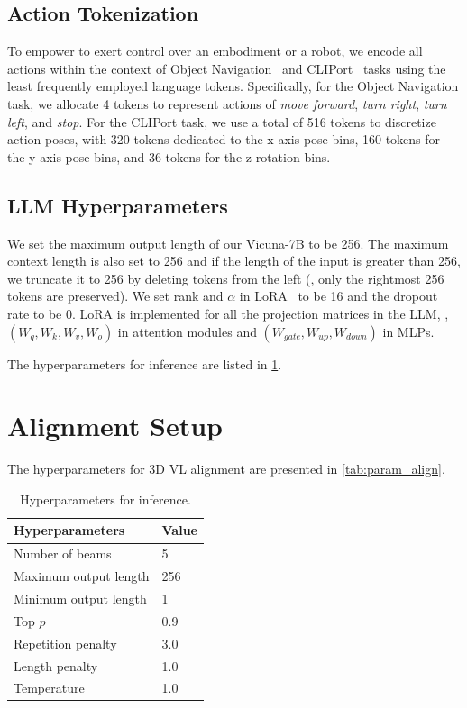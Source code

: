 \subsection{Action Tokenization}\label{sec:action_tokenization}

To empower \agent to exert control over an embodiment or a robot, we encode all actions within the context of Object Navigation~\citep{ramrakhya2022habitat} and CLIPort~\citep{cliport} tasks using the least frequently employed language tokens. Specifically, for the Object Navigation task, we allocate 4 tokens to represent actions of \textit{move forward}, \textit{turn right}, \textit{turn left}, and \textit{stop}. For the CLIPort task, we use a total of 516 tokens to discretize action poses, with 320 tokens dedicated to the x-axis pose bins, 160 tokens for the y-axis pose bins, and 36 tokens for the z-rotation bins.

\subsection{LLM Hyperparameters}
We set the maximum output length of our Vicuna-7B to be 256. The maximum context length is also set to 256 and if the length of the input is greater than 256, we truncate it to 256 by deleting tokens from the left (\ie, only the rightmost 256 tokens are preserved). We set rank and $\alpha$ in LoRA~\citep{hu2022lora} to be 16 and the dropout rate to be 0. LoRA is implemented for all the projection matrices in the LLM, \ie, $(W_q, W_k, W_v, W_o)$ in attention modules and $(W_{gate}, W_{up}, W_{down})$ in MLPs.

The hyperparameters for inference are listed in \cref{tab:parameter_beam}.


\section{Alignment Setup}
The hyperparameters for 3D VL alignment are presented in \cref{tab:param_align}.

\begin{table}[t!]
\centering
\small
\caption{Hyperparameters for \agent inference.}\label{tab:parameter_beam}
\begin{tabular}{@{}ll@{}}
\toprule
\textbf{Hyperparameters}  & \textbf{Value}   \\ \midrule
Number of beams          & 5     \\
Maximum output length    & 256   \\
Minimum output length    & 1     \\
Top $p$                   & 0.9   \\ 
Repetition penalty       & 3.0   \\
Length penalty           & 1.0   \\
Temperature              & 1.0   \\
\bottomrule
\end{tabular}
\end{table}


